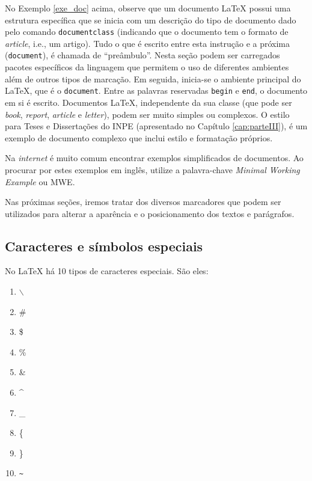 No Exemplo \ref{exe_doc} acima, observe que um documento \LaTeX{} possui uma estrutura específica que se inicia com um descrição do tipo de documento dado pelo comando \texttt{documentclass} (indicando que o documento tem o formato de \textit{article}, i.e., um artigo). Tudo o que é escrito entre esta instrução e a próxima ({\tt document}), é chamada de ``preâmbulo''. Nesta seção podem ser carregados pacotes específicos da linguagem que permitem o uso de diferentes ambientes além de outros tipos de marcação. Em seguida, inicia-se o ambiente principal do \LaTeX{}, que é o \texttt{document}. Entre as palavras reservadas \texttt{begin} e \texttt{end}, o documento em si é escrito. Documentos \LaTeX{}, independente da sua classe (que pode ser \textit{book}, \textit{report}, \textit{article} e \textit{letter}), podem ser muito simples ou complexos. O estilo para Teses e Dissertações do INPE (apresentado no Capítulo \ref{cap:parteIII}), é um exemplo de documento complexo que inclui estilo e formatação próprios.

\begin{marker}
  Na \textit{internet} é muito comum encontrar exemplos simplificados de documentos. Ao procurar por estes exemplos em inglês, utilize a palavra-chave \textit{Minimal Working Example} ou MWE.
\end{marker}


Nas próximas seções, iremos tratar dos diversos marcadores que podem ser utilizados para alterar a aparência e o posicionamento dos textos e parágrafos.

\subsection{Caracteres e símbolos especiais}
\label{sec:carac_especiais}

No \LaTeX{} há 10 tipos de caracteres especiais. São eles:

\begin{multicols}{5}
    \begin{enumerate}
        \item $\backslash$
        \item \#
        \item \$
        \item \%
        \item \&
        \item \^{}
        \item \_
        \item \{
        \item \}
        \item \texttt{\~{}}
    \end{enumerate}
\end{multicols}

